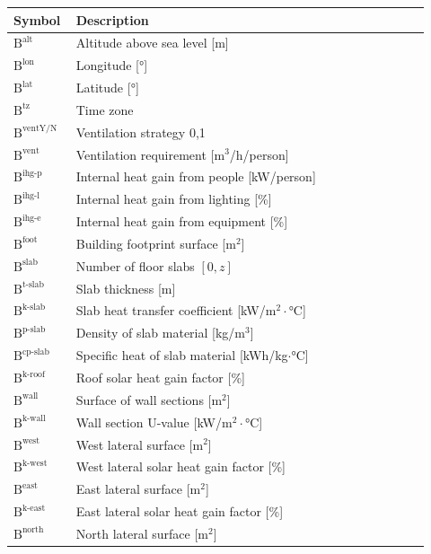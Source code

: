 \documentclass[11pt]{article}
\begin{document}
\begin{center}
\centering
\begin{tabular}{p{0.12\linewidth}p{0.8\linewidth}}
\hline
\textbf{Symbol} & \textbf{Description} \\
\hline
\(\text{B}^\text{alt}\) & Altitude above sea level [m] \\
\(\text{B}^\text{lon}\) & Longitude [°] \\
\(\text{B}^\text{lat}\) & Latitude [°] \\
\(\text{B}^\text{tz}\) & Time zone \\
\(\text{B}^\text{ventY/N}\) & Ventilation strategy {0,1} \\
\(\text{B}^\text{vent}\) & Ventilation requirement [m\(^3\)/h/person] \\
\(\text{B}^\text{ihg-p}\) & Internal heat gain from people [kW/person] \\
\(\text{B}^\text{ihg-l}\) & Internal heat gain from lighting [\%] \\
\(\text{B}^\text{ihg-e}\) & Internal heat gain from equipment [\%] \\
\(\text{B}^\text{foot}\) & Building footprint surface [m\(^2\)] \\
\(\text{B}^\text{slab}\) & Number of floor slabs \([0, z]\) \\
\(\text{B}^\text{t-slab}\) & Slab thickness [m] \\
\(\text{B}^\text{k-slab}\) & Slab heat transfer coefficient [kW/m\(^2\cdot\)°C] \\
\(\text{B}^\text{p-slab}\) & Density of slab material [kg/m\(^3\)] \\
\(\text{B}^\text{cp-slab}\) & Specific heat of slab material [kWh/kg\(\cdot\)°C] \\
\(\text{B}^\text{k-roof}\) & Roof solar heat gain factor [\%] \\
\(\text{B}^\text{wall}\) & Surface of wall sections [m\(^2\)] \\
\(\text{B}^\text{k-wall}\) & Wall section U-value [kW/m\(^2\cdot\)°C] \\
\(\text{B}^\text{west}\) & West lateral surface [m\(^2\)] \\
\(\text{B}^\text{k-west}\) & West lateral solar heat gain factor [\%] \\
\(\text{B}^\text{east}\) & East lateral surface [m\(^2\)] \\
\(\text{B}^\text{k-east}\) & East lateral solar heat gain factor [\%] \\
\(\text{B}^\text{north}\) & North lateral surface [m\(^2\)] \\

\end{tabular}
\end{center}
\end{document}
